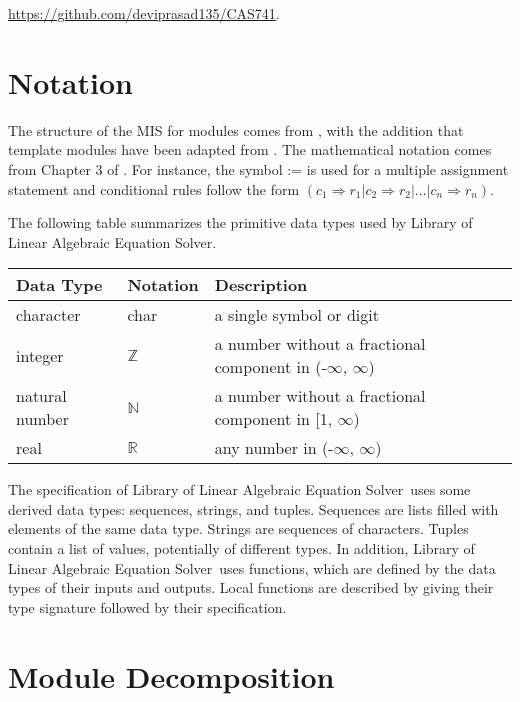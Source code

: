 \documentclass[12pt, titlepage]{article}
\newcommand{\progname}{Library of Linear Algebraic Equation Solver}
\begin{document}
\url{https://github.com/deviprasad135/CAS741}.  

\section{Notation}


The structure of the MIS for modules comes from \cite{hoffman1999software},
with the addition that template modules have been adapted from
\cite{ghezzi2002fundamentals}.  The mathematical notation comes from Chapter 3 of
\cite{hoffman1999software}.  For instance, the symbol := is used for a
multiple assignment statement and conditional rules follow the form $(c_1
\Rightarrow r_1 | c_2 \Rightarrow r_2 | ... | c_n \Rightarrow r_n )$.

The following table summarizes the primitive data types used by \progname. 

\begin{center}
\renewcommand{\arraystretch}{1.2}
\noindent 
\begin{tabular}{l l p{7.5cm}} 
\toprule 
\textbf{Data Type} & \textbf{Notation} & \textbf{Description}\\ 
\midrule
character & char & a single symbol or digit\\
integer & $\mathbb{Z}$ & a number without a fractional component in (-$\infty$, $\infty$) \\
natural number & $\mathbb{N}$ & a number without a fractional component in [1, $\infty$) \\
real & $\mathbb{R}$ & any number in (-$\infty$, $\infty$)\\
\bottomrule
\end{tabular} 
\end{center}

\noindent
The specification of \progname \ uses some derived data types: sequences, strings, and
tuples. Sequences are lists filled with elements of the same data type. Strings
are sequences of characters. Tuples contain a list of values, potentially of
different types. In addition, \progname \ uses functions, which
are defined by the data types of their inputs and outputs. Local functions are
described by giving their type signature followed by their specification.

\section{Module Decomposition}
\end{document}
